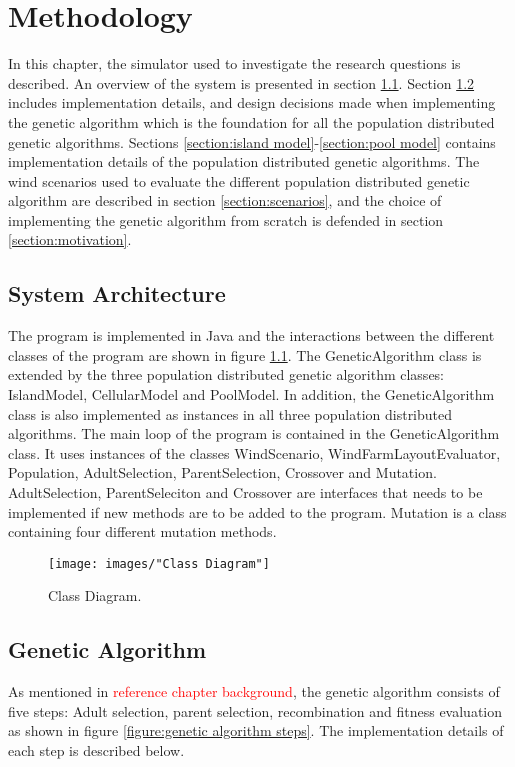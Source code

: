 \chapter{Methodology}\label{section:method}
In this chapter, the simulator used to investigate the research questions is described. An overview of the system is presented in section \ref{section:systemt architecture}. Section \ref{section:genetic algorithm} includes implementation details, and design decisions made when implementing the genetic algorithm which is the foundation for all the population distributed genetic algorithms. Sections \ref{section:island model}-\ref{section:pool model} contains implementation details of the population distributed genetic algorithms. The wind scenarios used to evaluate the different population distributed genetic algorithm are described in section \ref{section:scenarios}, and the choice of implementing the genetic algorithm from scratch is defended in section \ref{section:motivation}.


\section{System Architecture}\label{section:systemt architecture}
The program is implemented in Java and the interactions between the different classes of the program are shown in figure \ref{figure:class diagram}. The GeneticAlgorithm class is extended by the three population distributed genetic algorithm classes: IslandModel, CellularModel and PoolModel. In addition, the GeneticAlgorithm class is also implemented as instances in all three population distributed algorithms. The main loop of the program is contained in the GeneticAlgorithm class. It uses instances of the classes WindScenario, WindFarmLayoutEvaluator, Population, AdultSelection, ParentSelection, Crossover and Mutation. AdultSelection, ParentSeleciton and Crossover are interfaces that needs to be implemented if new methods are to be added to the program. Mutation is a class containing four different mutation methods. 


\begin{figure}[h!]
\begin{center}
\texttt{[image: images/"Class Diagram"]}
\caption{Class Diagram.}
\label{figure:class diagram}
\end{center}
\end{figure}


\section{Genetic Algorithm}\label{section:genetic algorithm}
As mentioned in \textcolor{red}{reference chapter background}, the genetic algorithm consists of five steps: Adult selection, parent selection, recombination and fitness evaluation as shown in figure \ref{figure:genetic algorithm steps}. The implementation details of each step is described below.


